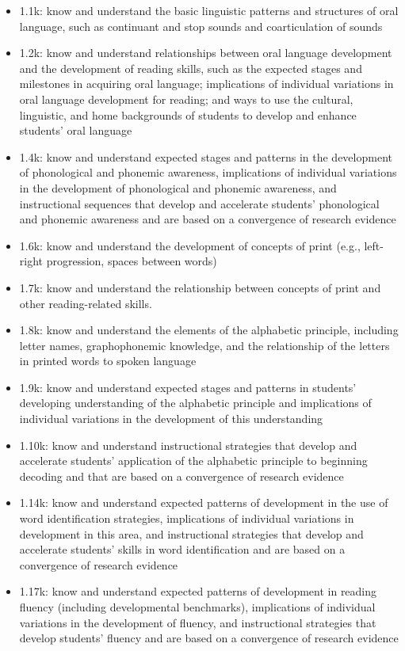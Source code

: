 \documentclass[10pt]{article}
\begin{document}
\begin{itemize}
\item 1.1k: know and understand the basic linguistic patterns and structures of oral language, such as continuant and stop sounds and coarticulation of sounds
\item 1.2k: know and understand relationships between oral language development and the development of reading skills, such as the expected stages and milestones in acquiring oral language; implications of individual variations in oral language development for reading; and ways to use the cultural, linguistic, and home backgrounds of students to develop and enhance students’ oral language
\item 1.4k: know and understand expected stages and patterns in the development of phonological and phonemic awareness, implications of individual variations in the development of phonological and phonemic awareness, and instructional sequences that develop and accelerate students’ phonological and phonemic awareness and are based on a convergence of research evidence
\item 1.6k: know and understand the development of concepts of print (e.g., left-right progression, spaces between words)
\item 1.7k: know and understand the relationship between concepts of print and other reading-related skills.
\item 1.8k: know and understand the elements of the alphabetic principle, including letter names, graphophonemic knowledge, and the relationship of the letters in printed words to spoken language
\item 1.9k: know and understand expected stages and patterns in students’ developing understanding of the alphabetic principle and implications of individual variations in the development of this understanding
\item 1.10k: know and understand instructional strategies that develop and accelerate students’ application of the alphabetic principle to beginning decoding and that are based on a convergence of research evidence
\item 1.14k: know and understand expected patterns of development in the use of word identification strategies, implications of individual variations in development in this area, and instructional strategies that develop and accelerate students’ skills in word identification and are based on a convergence of research evidence
\item 1.17k: know and understand expected patterns of development in reading fluency (including developmental benchmarks), implications of individual variations in the development of fluency, and instructional strategies that develop students’ fluency and are based on a convergence of research evidence

\end{itemize}
\end{document}
